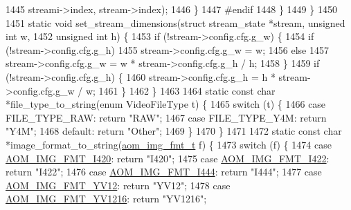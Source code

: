\begin{DoxyCodeInclude}
{{{{{{{{{{{{{{{{{{{{{{{{1445             streami->index, stream->index);
1446     \}
1447 \textcolor{preprocessor}{#endif}
1448   \}
1449 \}
1450 
1451 \textcolor{keyword}{static} \textcolor{keywordtype}{void} set\_stream\_dimensions(\textcolor{keyword}{struct} stream\_state *stream, \textcolor{keywordtype}{unsigned} \textcolor{keywordtype}{int} w,
1452     \textcolor{keywordtype}{unsigned} \textcolor{keywordtype}{int} h) \{
1453   \textcolor{keywordflow}{if} (!stream->config.cfg.g\_w) \{
1454     \textcolor{keywordflow}{if} (!stream->config.cfg.g\_h)
1455       stream->config.cfg.g\_w = w;
1456     \textcolor{keywordflow}{else}
1457       stream->config.cfg.g\_w = w * stream->config.cfg.g\_h / h;
1458   \}
1459   \textcolor{keywordflow}{if} (!stream->config.cfg.g\_h) \{
1460     stream->config.cfg.g\_h = h * stream->config.cfg.g\_w / w;
1461   \}
1462 \}
1463 
1464 \textcolor{keyword}{static} \textcolor{keyword}{const} \textcolor{keywordtype}{char} *file\_type\_to\_string(\textcolor{keyword}{enum} VideoFileType t) \{
1465   \textcolor{keywordflow}{switch} (t) \{
1466   \textcolor{keywordflow}{case} FILE\_TYPE\_RAW: \textcolor{keywordflow}{return} \textcolor{stringliteral}{"RAW"};
1467   \textcolor{keywordflow}{case} FILE\_TYPE\_Y4M: \textcolor{keywordflow}{return} \textcolor{stringliteral}{"Y4M"};
1468   \textcolor{keywordflow}{default}: \textcolor{keywordflow}{return} \textcolor{stringliteral}{"Other"};
1469   \}
1470 \}
1471 
1472 \textcolor{keyword}{static} \textcolor{keyword}{const} \textcolor{keywordtype}{char} *image\_format\_to\_string(\hyperlink{aom__image_8h_ab71efff8c7f49380fad23b93bc2e9bfc}{aom\_img\_fmt\_t} f) \{
1473   \textcolor{keywordflow}{switch} (f) \{
1474   \textcolor{keywordflow}{case} \hyperlink{aom__image_8h_a930317c04b4bd0a660bb5e744055523cabd778a3d697463e89d12a1117f417b60}{AOM\_IMG\_FMT\_I420}: \textcolor{keywordflow}{return} \textcolor{stringliteral}{"I420"};
1475   \textcolor{keywordflow}{case} \hyperlink{aom__image_8h_a930317c04b4bd0a660bb5e744055523cab2f75281e94ebc0f0bc728ef287cd3e8}{AOM\_IMG\_FMT\_I422}: \textcolor{keywordflow}{return} \textcolor{stringliteral}{"I422"};
1476   \textcolor{keywordflow}{case} \hyperlink{aom__image_8h_a930317c04b4bd0a660bb5e744055523ca89d423506e948ab7d3b98b5750b92655}{AOM\_IMG\_FMT\_I444}: \textcolor{keywordflow}{return} \textcolor{stringliteral}{"I444"};
1477   \textcolor{keywordflow}{case} \hyperlink{aom__image_8h_a930317c04b4bd0a660bb5e744055523cad28244100a2754409f285b77a3db90a0}{AOM\_IMG\_FMT\_YV12}: \textcolor{keywordflow}{return} \textcolor{stringliteral}{"YV12"};
1478   \textcolor{keywordflow}{case} \hyperlink{aom__image_8h_a930317c04b4bd0a660bb5e744055523ca6d845490a6333fca3ac22cc1105deadd}{AOM\_IMG\_FMT\_YV1216}: \textcolor{keywordflow}{return} \textcolor{stringliteral}{"YV1216"};
}}}}}}}}}}}}}}}}}}}}}}}}
\end{DoxyCodeInclude}
